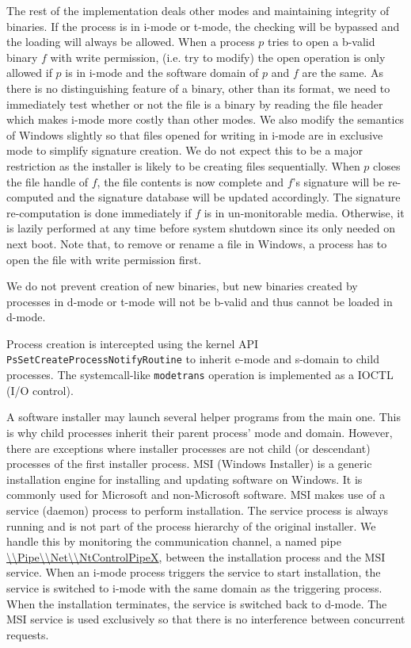 The rest of the implementation deals other modes
and maintaining integrity of binaries.
If the process is in i-mode or t-mode, the checking
will be bypassed and the loading will always be allowed.
When a process $p$ tries to open a b-valid binary
$f$ with write permission, (i.e. try to modify)
the open operation is only allowed if $p$ is in i-mode
and the software domain of $p$ and $f$ are the same.
As there is no distinguishing feature of a binary, other than its format,
we need to immediately test whether or not the file is a binary
by reading the file header which  makes i-mode more costly
than other modes.
We also modify the semantics of Windows slightly so that files opened
for writing in i-mode are in exclusive mode to simplify signature creation.
We do not expect this to be a major restriction as the installer is likely
to be creating files sequentially.
When $p$ closes the file handle of $f$, the file contents is now complete
and $f$'s signature will be re-computed and the signature database will 
be updated accordingly.
The signature re-computation is done immediately if $f$ is in 
un-monitorable media.
Otherwise, it is lazily performed at any time before system shutdown since
its only needed on next boot.
Note that, to remove or rename a file in Windows, a process has to open the file
with write permission first.

We do not prevent creation of new binaries,
but new binaries created by processes in d-mode or t-mode will not
be b-valid and thus cannot be loaded in d-mode.

Process creation is intercepted using
the kernel API {\tt PsSetCreateProcessNotifyRoutine} to inherit e-mode and
s-domain to child processes.
The systemcall-like {\tt modetrans} operation
is implemented as a IOCTL (I/O control).

A software installer may launch
several helper programs from the main one.
This is why child processes inherit their parent process' mode
and domain.
However, there are exceptions where installer processes
are not child (or descendant) processes of the first installer process.
MSI (Windows Installer) is a generic installation engine
for installing and updating software on Windows.
It is commonly used for Microsoft and non-Microsoft software.
MSI makes use of a service (daemon) process to perform installation.
The service process is always running and is not part of the
process hierarchy of the original installer.
We handle this by monitoring the communication channel, 
a named pipe \url{\\Pipe\\Net\\NtControlPipeX}, between the
installation process and the MSI service.
When an i-mode process triggers the service to start installation,
the service is switched to i-mode with the same domain as the triggering
process.
When the installation terminates, the service is switched back to d-mode.
The MSI service is used exclusively so that there is no interference between
concurrent requests.


